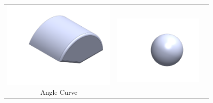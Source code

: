 \begin{figure}[htbp]
  \centering
  \begin{minipage}{0.5\textwidth} %
    \centering
    \setlength{\tabcolsep}{1pt}
    \renewcommand{\arraystretch}{0.9}

    \begin{tabular}{ccc}
      \begin{minipage}{0.3\linewidth}
        \centering
        \includegraphics[width=\linewidth]{figures/parts/angle_curve.PNG}
        \scriptsize Angle Curve
      \end{minipage} &
      \begin{minipage}{0.3\linewidth}
        \centering
        \includegraphics[width=\linewidth]{figures/parts/Ball.PNG}

\end{minipage}
\end{tabular}
\end{minipage}
\end{figure}
